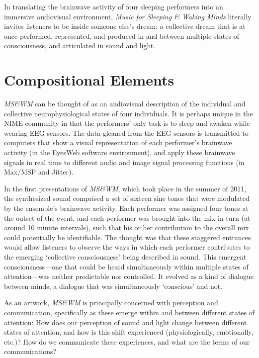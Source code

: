 In translating the brainwave activity of four sleeping performers into an
immersive audiovisual environment, \textit{Music for Sleeping \& Waking Minds
}literally invites listeners to be inside someone else's dream: a collective
dream that is at once performed, represented, and produced in and between
multiple states of consciousness, and articulated in sound and light.

\section{Compositional Elements}

\textit{MS\&WM} can be thought of as an audiovisual description of the
individual and collective neurophysiological states of four individuals. It is
perhaps unique in the NIME community in that the performers' only task is to
sleep and awaken while wearing EEG sensors. The data gleaned from the EEG sensors
is transmitted to computers that show a visual representation of each performer's
brainwave activity (in the EyesWeb software environment), and apply these
brainwave signals in real time to different audio and image signal processing
functions (in Max/MSP and Jitter).

In the first presentations of \textit{MS\&WM}, which took place in the summer of
2011, the synthesized sound comprised a set of sixteen sine tones that were
modulated by the ensemble's brainwave activity.  Each performer was assigned four
tones at the outset of the event, and each performer was brought into the mix in
turn (at around 10 minute intervals), such that his or her contribution to the
overall mix could potentially be identifiable. The thought was that these
staggered entrances would allow listeners to observe the ways in which each
performer contributes to the emerging `collective consciousness' being described
in sound.  This emergent consciousness---one that could be heard simultaneously
within multiple states of attention---was neither predictable nor controlled. 
It evolved as a kind of dialogue between minds, a dialogue that was
simultaneously `conscious' and not.

As an artwork, \textit{MS\&WM} is principally concerned with perception and
communication, specifically as these emerge within and between different states
of attention: How does our perception of sound and light change between different
states of attention, and how is this shift experienced (physiologically,
emotionally, etc.)? How do we communicate these experiences, and what are the
terms of our communications?

